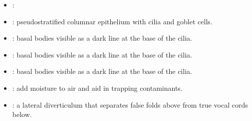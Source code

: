 \begin{multicols}{2}
\begin{itemize}
  \item {}:
  
  \begin{center}
  \end{center}
  
  \item {}: pseudostratified columnar epithelium with cilia and goblet cells. 
  
  \begin{center}
  \end{center}
  
  \item {}: basal bodies visible as a dark line at the base of the cilia.
  
  \begin{center}
  \end{center}
  
  \item {}: basal bodies visible as a dark line at the base of the cilia.
  
  \begin{center}
  \end{center}
  
  \item {}: basal bodies visible as a dark line at the base of the cilia.
  
  \begin{center}
  \end{center}
  
  \item {}: add moisture to air and aid in trapping contaminants.
  
  \begin{center}
  \end{center}
  
  \item {}:  a lateral diverticulum that separates false folds above from true vocal cords below.
  
  \begin{center}
  \end{center}
  

\end{itemize}
\end{multicols}
